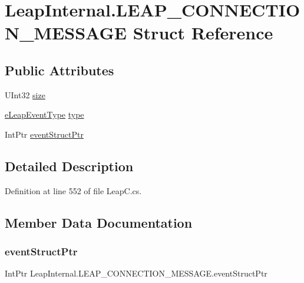 \hypertarget{struct_leap_internal_1_1_l_e_a_p___c_o_n_n_e_c_t_i_o_n___m_e_s_s_a_g_e}{}\section{Leap\+Internal.\+L\+E\+A\+P\+\_\+\+C\+O\+N\+N\+E\+C\+T\+I\+O\+N\+\_\+\+M\+E\+S\+S\+A\+GE Struct Reference}
\label{struct_leap_internal_1_1_l_e_a_p___c_o_n_n_e_c_t_i_o_n___m_e_s_s_a_g_e}
\subsection*{Public Attributes}
\begin{DoxyCompactItemize}
\item 
U\+Int32 \mbox{\hyperlink{struct_leap_internal_1_1_l_e_a_p___c_o_n_n_e_c_t_i_o_n___m_e_s_s_a_g_e_aba211251d1fc15c5b5142d010672990f}{size}}
\item 
\mbox{\hyperlink{namespace_leap_internal_aa0ca3ef781ee69ce6a3cee33d6067d1a}{e\+Leap\+Event\+Type}} \mbox{\hyperlink{struct_leap_internal_1_1_l_e_a_p___c_o_n_n_e_c_t_i_o_n___m_e_s_s_a_g_e_ab87d60121e7d5cc24b3ac9a072b20e8d}{type}}
\item 
Int\+Ptr \mbox{\hyperlink{struct_leap_internal_1_1_l_e_a_p___c_o_n_n_e_c_t_i_o_n___m_e_s_s_a_g_e_ac00200c558d42511cd50600bba71bdc3}{event\+Struct\+Ptr}}
\end{DoxyCompactItemize}


\subsection{Detailed Description}


Definition at line 552 of file Leap\+C.\+cs.



\subsection{Member Data Documentation}
\mbox{\label{struct_leap_internal_1_1_l_e_a_p___c_o_n_n_e_c_t_i_o_n___m_e_s_s_a_g_e_ac00200c558d42511cd50600bba71bdc3}} 
\subsubsection{\texorpdfstring{eventStructPtr}{eventStructPtr}}
{\footnotesize\ttfamily Int\+Ptr Leap\+Internal.\+L\+E\+A\+P\+\_\+\+C\+O\+N\+N\+E\+C\+T\+I\+O\+N\+\_\+\+M\+E\+S\+S\+A\+G\+E.\+event\+Struct\+Ptr}



